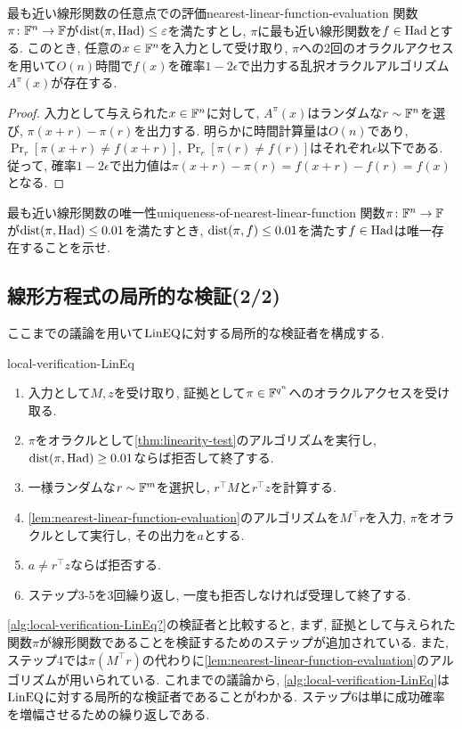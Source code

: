   \begin{lemma}{最も近い線形関数の任意点での評価}{nearest-linear-function-evaluation}
    関数$\pi\colon\mathbb{F}^n\to\mathbb{F}$が$\mathrm{dist}(\pi,\mathrm{Had})\le \varepsilon$を満たすとし,
    $\pi$に最も近い線形関数を$f\in\mathrm{Had}$とする.
    このとき, 任意の$x\in\mathbb{F}^n$を入力として受け取り, $\pi$への2回のオラクルアクセスを用いて$O(n)$時間で$f(x)$を確率$1-2\epsilon$で出力する乱択オラクルアルゴリズム$A^\pi(x)$が存在する.
  \end{lemma}
  \begin{proof}
    入力として与えられた$x\in\mathbb{F}^n$に対して, $A^\pi(x)$はランダムな$r\sim\mathbb{F}^n$を選び, $\pi(x+r)-\pi(r)$を出力する.
    明らかに時間計算量は$O(n)$であり, $\Pr_r[\pi(x+r)\ne f(x+r)], \Pr_r[\pi(r)\ne f(r)]$はそれぞれ$\epsilon$以下である.
    従って, 確率$1-2\epsilon$で出力値は$\pi(x+r)-\pi(r)=f(x+r)-f(r)=f(x)$となる.
  \end{proof}
  
  \begin{exercise}{最も近い線形関数の唯一性}{uniqueness-of-nearest-linear-function}
  関数$\pi\colon\mathbb{F}^n\to \mathbb{F}$が$\mathrm{dist}(\pi,\mathrm{Had}) \le 0.01$を満たすとき,
  $\mathrm{dist}(\pi,f)\le 0.01$を満たす$f\in\mathrm{Had}$は唯一存在することを示せ.
  \end{exercise}


\subsection{線形方程式の局所的な検証(2/2)}
ここまでの議論を用いて$\text{LinEQ}$に対する局所的な検証者を構成する.
\begin{algo}{}{local-verification-LinEq}
  \begin{enumerate}
    \item 入力として$M,z$を受け取り, 証拠として$\pi \in \mathbb{F}^{q^n}$へのオラクルアクセスを受け取る.
    \item $\pi$をオラクルとして\cref{thm:linearity-test}のアルゴリズムを実行し, $\mathrm{dist}(\pi,\mathrm{Had})\ge 0.01$ならば拒否して終了する.
    \item 一様ランダムな$r\sim\mathbb{F}^m$を選択し, $r^\top M$と$r^\top z$を計算する.
    \item \cref{lem:nearest-linear-function-evaluation}のアルゴリズムを$M^\top r$を入力, $\pi$をオラクルとして実行し, その出力を$a$とする.
    \item $a\ne r^\top z$ならば拒否する.
    \item ステップ3-5を3回繰り返し, 一度も拒否しなければ受理して終了する.
  \end{enumerate}
\end{algo}
\cref{alg:local-verification-LinEq?}の検証者と比較すると,
まず, 証拠として与えられた関数$\pi$が線形関数であることを検証するためのステップが追加されている.
また, ステップ4では$\pi(M^\top r)$の代わりに\cref{lem:nearest-linear-function-evaluation}のアルゴリズムが用いられている.
これまでの議論から, \cref{alg:local-verification-LinEq}は$\text{LinEQ}$に対する局所的な検証者であることがわかる.
ステップ6は単に成功確率を増幅させるための繰り返しである.

